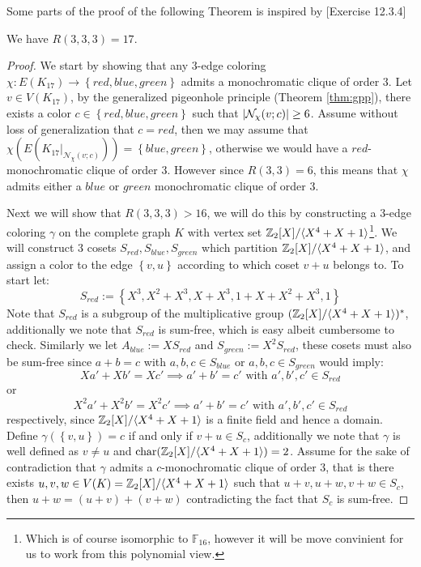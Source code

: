 Some parts of the proof of the following Theorem is inspired by \cite{graph_theory}[Exercise 12.3.4]
\begin{theorem}\label{thm:R3_3_3}
	We have $R(3, 3, 3) = 17$.
\end{theorem}
\begin{proof}
	We start by showing that any $3$-edge coloring $\chi: E(K_{17}) \to \left\{red, blue, green\right\}$ admits a monochromatic clique of order $3$. Let $v \in V(K_{17})$, by the generalized pigeonhole principle (Theorem \ref{thm:gpp}), there exists a color $c \in \left\{red, blue, green\right\}$ such that $\left\lvert\mathcal{N}_{\chi}(v; c)\right\rvert \geq 6$. Assume without loss of generalization that $c = red$, then we may assume that $\chi\left(E(K_{17} \vert_{\mathcal{N}_{\chi}(v; c)})\right) = \left\{blue, green\right\}$, otherwise we would have a $red$-monochromatic clique of order $3$. However since $R(3, 3) = 6$, this means that $\chi$ admits either a $blue$ or $green$ monochromatic clique of order $3$.

	Next we will show that $R(3, 3, 3) > 16$, we will do this by constructing a $3$-edge coloring $\gamma$ on the complete graph $K$ with vertex set $\mathbb{Z}_2[X] / \langle X^4 + X + 1\rangle$\footnote{Which is of course isomorphic to $\mathbb{F}_{16}$, however it will be move convinient for us to work from this polynomial view.}. We will construct $3$ cosets $S_{red}, S_{blue}, S_{green}$ which partition $\mathbb{Z}_2[X] / \langle X^4 + X + 1\rangle$, and assign a color to the edge $\left\{v, u\right\}$ according to which coset $v + u$ belongs to. To start let:
	\begin{equation*}
		S_{red} := \left\{X^3, X^2 + X^{3}, X + X^{3}, 1 + X + X^2 + X^3 , 1\right\}
	\end{equation*}
	Note that $S_{red}$ is a subgroup of the multiplicative group $(\mathbb{Z}_2[X] / \langle X^4 + X + 1\rangle)^{*}$, additionally we note that $S_{red}$ is sum-free, which is easy albeit cumbersome to check. Similarly we let $A_{blue} := X S_{red}$ and $S_{green} := X^2 S_{red}$, these cosets must also be sum-free since $a + b = c$ with $a, b, c \in S_{blue}$ or $a, b, c \in S_{green}$ would imply:
	\begin{equation*}
		Xa' + Xb' = Xc' \implies a' + b' = c' \text{ with } a', b', c' \in S_{red}
	\end{equation*}
	or
	\begin{equation*}
		X^{2}a' + X^{2}b' = X^{2}c' \implies a' + b' = c' \text{ with } a', b', c' \in S_{red}
	\end{equation*}
	respectively, since $\mathbb{Z}_2[X] / \langle X^4 + X + 1\rangle$ is a finite field and hence a domain. Define $\gamma(\left\{v, u\right\}) = c$ if and only if $v + u \in S_{c}$, additionally we note that $\gamma$ is well defined as $v \neq u$ and $\textnormal{char}(\mathbb{Z}_2[X] / \langle X^4 + X + 1\rangle) = 2$. Assume for the sake of contradiction that $\gamma$ admits a $c$-monochromatic clique of order $3$, that is there exists $u, v, w \in V(K) = \mathbb{Z}_2[X] / \langle X^4 + X + 1\rangle$ such that $u + v, u + w, v + w \in S_c$, then $u + w = (u + v) + (v + w)$ contradicting the fact that $S_c$ is sum-free.
\end{proof}

